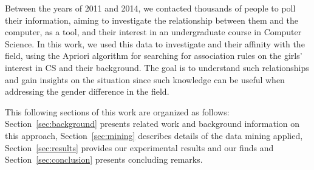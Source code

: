 
Between the years of 2011 and 2014, we contacted thousands of people to poll their information, aiming to investigate the relationship between them and the computer, as a tool, and their interest in an undergraduate course in Computer Science. In this work, we used this data to investigate and their affinity with the field, using the Apriori algorithm for searching for association rules on the girls' interest in CS and their background. The goal is to understand such relationships and gain insights on the situation since such knowledge can be useful when addressing the gender difference in the field.

This following sections of this work are organized as follows: Section~\ref{sec:background} presents related work and background information on this approach, Section~\ref{sec:mining} describes details of the data mining applied, Section~\ref{sec:results} provides our experimental results and our finds and Section~\ref{sec:conclusion} presents concluding remarks.
